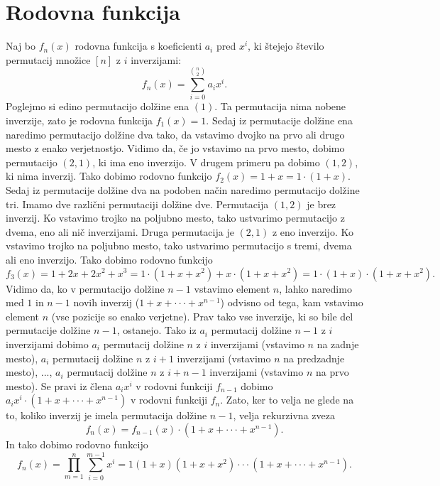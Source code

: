 \documentclass[a4paper, 12pt]{book}
\begin{document}
\section{ Rodovna funkcija }
Naj bo $f_n(x)$ rodovna funkcija s koeficienti $a_i$ pred $x^i$, ki štejejo število permutacij množice $[n]$ z $i$ inverzijami:
\[
    f_n(x) = \sum_{i=0}^{\binom{n}{2}} a_i x^i.
\]
Poglejmo si edino permutacijo dolžine ena $(1)$. Ta permutacija nima nobene inverzije, zato je rodovna funkcija $f_1(x) = 1$. Sedaj iz permutacije dolžine ena naredimo permutacijo dolžine dva tako, da vstavimo dvojko na prvo ali drugo mesto z enako verjetnostjo. Vidimo da, če jo vstavimo na prvo mesto, dobimo permutacijo $(2, 1)$, ki ima eno inverzijo. V drugem primeru pa dobimo $(1, 2)$, ki nima inverzij. Tako dobimo rodovno funkcijo $f_2(x) = 1 + x = 1 \cdot (1 + x)$. Sedaj iz permutacije dolžine dva na podoben način naredimo permutacijo dolžine tri. Imamo dve različni permutaciji dolžine dve. Permutacija $(1, 2)$ je brez inverzij. Ko vstavimo trojko na poljubno mesto, tako ustvarimo permutacijo z dvema, eno ali nič inverzijami. Druga permutacija je $(2, 1)$ z eno inverzijo. Ko vstavimo trojko na poljubno mesto, tako ustvarimo permutacijo s tremi, dvema ali eno inverzijo. Tako dobimo rodovno funkcijo 
\[
    f_3(x) = 1 + 2x + 2x^2 + x^3 = 1 \cdot (1 + x + x^2) + x \cdot (1 + x + x^2) = 1 \cdot (1 + x) \cdot (1 + x + x^2).
\]
Vidimo da, ko v permutacijo dolžine $n-1$ vstavimo element $n$, lahko naredimo med $1$ in $n-1$ novih inverzij ($1 + x + \cdot\cdot\cdot + x^{n-1}$) odvisno od tega, kam vstavimo element $n$ (vse pozicije so enako verjetne). Prav tako vse inverzije, ki so bile del permutacije dolžine $n-1$, ostanejo. Tako iz $a_i$ permutacij dolžine $n-1$ z $i$ inverzijami dobimo $a_i$ permutacij dolžine $n$ z $i$ inverzijami (vstavimo $n$ na zadnje mesto), $a_i$ permutacij dolžine $n$ z $i+1$ inverzijami (vstavimo $n$ na predzadnje mesto), ..., $a_i$ permutacij dolžine $n$ z $i+n-1$ inverzijami (vstavimo $n$ na prvo mesto). Se pravi iz člena $a_i x^i$ v rodovni funkciji $f_{n-1}$ dobimo $a_i x^i \cdot (1 + x + \cdot\cdot\cdot + x^{n-1})$ v rodovni funkciji $f_n$.
Zato, ker to velja ne glede na to, koliko inverzij je imela permutacija dolžine $n-1$, velja rekurzivna zveza
\[
    f_n(x) = f_{n-1}(x) \cdot (1 + x + \cdot\cdot\cdot + x^{n-1}).
\]
In tako dobimo rodovno funkcijo
\[
    f_n(x) = \prod_{m=1}^{n}\sum_{i=0}^{m-1} x^i = 1 (1 + x) (1 + x + x^2) \cdot\cdot\cdot (1 + x + \cdot\cdot\cdot + x^{n-1}).
\]
\end{document}
